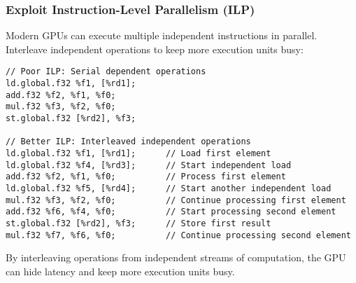 \subsubsection{Exploit Instruction-Level Parallelism (ILP)}

Modern GPUs can execute multiple independent instructions in parallel. Interleave independent operations to keep more execution units busy:

\begin{lstlisting}[style=ptx]
// Poor ILP: Serial dependent operations
ld.global.f32 %f1, [%rd1];
add.f32 %f2, %f1, %f0;
mul.f32 %f3, %f2, %f0;
st.global.f32 [%rd2], %f3;

// Better ILP: Interleaved independent operations
ld.global.f32 %f1, [%rd1];      // Load first element
ld.global.f32 %f4, [%rd3];      // Start independent load
add.f32 %f2, %f1, %f0;          // Process first element
ld.global.f32 %f5, [%rd4];      // Start another independent load
mul.f32 %f3, %f2, %f0;          // Continue processing first element
add.f32 %f6, %f4, %f0;          // Start processing second element
st.global.f32 [%rd2], %f3;      // Store first result
mul.f32 %f7, %f6, %f0;          // Continue processing second element
\end{lstlisting}

By interleaving operations from independent streams of computation, the GPU can hide latency and keep more execution units busy.

